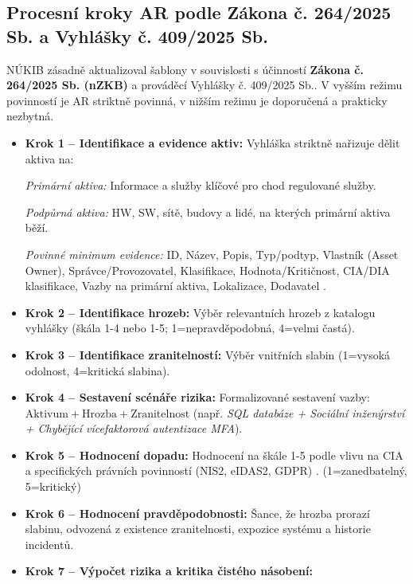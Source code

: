 \documentclass[10pt,a4paper]{article}
\begin{document}
	\subsection{Procesní kroky AR podle Zákona č. 264/2025 Sb. a Vyhlášky č. 409/2025 Sb.}
	NÚKIB zásadně aktualizoval šablony v souvislosti s účinností \textbf{Zákona č. 264/2025 Sb. (nZKB)} a prováděcí Vyhlášky č. 409/2025 Sb.. V vyšším režimu povinností je AR striktně povinná, v nižším režimu je doporučená a prakticky nezbytná. 
	\begin{itemize}
		\item \textbf{Krok 1 -- Identifikace a evidence aktiv:} Vyhláška striktně nařizuje dělit aktiva na: 
		
		\textit{Primární aktiva:} Informace a služby klíčové pro chod regulované služby. 
		
		\textit{Podpůrná aktiva:} HW, SW, sítě, budovy a lidé, na kterých primární aktiva běží.
		
		\textit{Povinné minimum evidence:} ID, Název, Popis, Typ/podtyp, Vlastník (Asset Owner), Správce/Provozovatel, Klasifikace, Hodnota/Kritičnost, CIA/DIA klasifikace, Vazby na primární aktiva, Lokalizace, Dodavatel .
		
		\item \textbf{Krok 2 -- Identifikace hrozeb:} Výběr relevantních hrozeb z katalogu vyhlášky (škála 1-4 nebo 1-5; 1=nepravděpodobná, 4=velmi častá).
		
		\item \textbf{Krok 3 -- Identifikace zranitelností:} Výběr vnitřních slabin (1=vysoká odolnost, 4=kritická slabina).
		
		\item \textbf{Krok 4 -- Sestavení scénáře rizika:} Formalizované sestavení vazby: $\text{Aktivum} + \text{Hrozba} + \text{Zranitelnost}$ (např. \textit{SQL databáze + Sociální inženýrství + Chybějící vícefaktorová autentizace MFA}).
		
		\item \textbf{Krok 5 -- Hodnocení dopadu:} Hodnocení na škále 1-5 podle vlivu na CIA a specifických právních povinností (NIS2, eIDAS2, GDPR) . (1=zanedbatelný, 5=kritický)
		
		\item \textbf{Krok 6 -- Hodnocení pravděpodobnosti:} Šance, že hrozba prorazí slabinu, odvozená z existence zranitelnosti, expozice systému a historie incidentů.
		
		\item \textbf{Krok 7 -- Výpočet rizika a kritika čistého násobení:}
		

\end{itemize}
\end{document}

